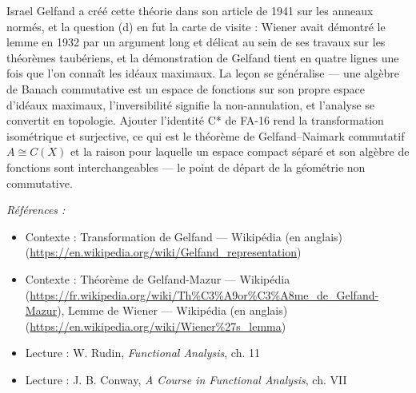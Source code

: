 \documentclass[11pt]{article}
\newenvironment{refs}{\par\small\noindent\emph{Références :}\begin{itemize}\setlength\itemsep{0pt}}{\end{itemize}\normalsize}
\begin{document}
\noindent Israel Gelfand a créé cette théorie dans son article de 1941 sur les anneaux normés, et
la question (d) en fut la carte de visite : Wiener avait démontré le lemme en 1932 par un argument long et
délicat au sein de ses travaux sur les théorèmes taubériens, et la démonstration de Gelfand tient en
quatre lignes une fois que l'on connaît les idéaux maximaux. La leçon se généralise --- une algèbre de
Banach commutative est un espace de fonctions sur son propre espace d'idéaux maximaux, l'inversibilité
signifie la non-annulation, et l'analyse se convertit en topologie. Ajouter l'identité C* de FA-16 rend la
transformation isométrique et surjective, ce qui est le théorème de Gelfand--Naimark commutatif
$ A \cong C(X) $ et la raison pour laquelle un espace compact séparé et son algèbre de fonctions sont
interchangeables --- le point de départ de la géométrie non commutative.

\begin{refs}
\item Contexte : Transformation de Gelfand --- Wikipédia (en anglais) (\url{https://en.wikipedia.org/wiki/Gelfand_representation})
\item Contexte : Théorème de Gelfand-Mazur --- Wikipédia (\url{https://fr.wikipedia.org/wiki/Th%C3%A9or%C3%A8me_de_Gelfand-Mazur}), Lemme de Wiener --- Wikipédia (en anglais) (\url{https://en.wikipedia.org/wiki/Wiener%27s_lemma})
\item Lecture : W. Rudin, \textit{Functional Analysis}, ch. 11
\item Lecture : J. B. Conway, \textit{A Course in Functional Analysis}, ch. VII
\end{refs}

\bigskip
\end{document}
